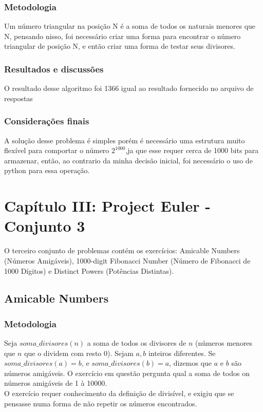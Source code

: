 \documentclass{article}
\begin{document}
        \subsubsection{Metodologia}
        Um número triangular na posição N é a soma de todos os naturais menores que N, pensando nisso, foi necessário criar uma forma para encontrar o número triangular de posição N, e então criar uma forma de testar seus divisores.
        
        \subsubsection{Resultados e discussões}
        O resultado desse algoritmo foi 1366 igual ao resultado fornecido no arquivo de respostas
        
        \subsubsection{Considerações finais}
        A solução desse problema é simples porém é necessário uma estrutura muito flexível para comportar o número $2^1000$,ja que esse requer cerca de 1000 bits para armazenar, então, ao contrario da minha decisão inicial, foi necessário o uso de python para essa operação.

\section{Capítulo III: Project Euler - Conjunto 3}
O terceiro conjunto de problemas contém os exercícios: Amicable Numbers (Números Amigáveis), 1000-digit Fibonacci Number (Número de Fibonacci de 1000 Dígitos) e Distinct Powers (Potências Distintas).
    \subsection{Amicable Numbers}
        
        \subsubsection{Metodologia}
        Seja $soma\_divisores(n)$ a soma de todos os divisores de $n$ (números menores que $n$ que o dividem com resto 0). Sejam $a, b$ inteiros diferentes. Se $soma\_divisores(a) = b$, e $soma\_divisores(b) = a$, dizemos que $a$ e $b$ são números amigáveis. O exercício em questão pergunta qual a soma de todos on números amigáveis de 1 à 10000.\\
        O exercício requer conhecimento da definição de divisível, e exigiu que se pensasse numa forma de não repetir os números encontrados.
        
\end{document}
